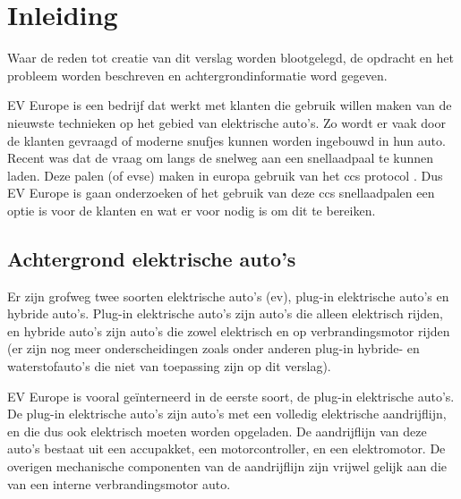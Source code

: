 \chapter{Inleiding}
\label{inleiding}

\begin{center}
    \begin{minipage}{0.5\textwidth}
        \begin{small}
            Waar de reden tot creatie van dit verslag worden blootgelegd, de
            opdracht en het probleem worden beschreven en achtergrondinformatie
            word gegeven.
        \end{small}
    \end{minipage}
    \vspace{0.5cm}
\end{center}

\noindent EV Europe is een bedrijf dat werkt met klanten die gebruik willen
maken van de nieuwste technieken op het gebied van elektrische auto's. Zo wordt
er vaak door de klanten gevraagd of moderne snufjes kunnen worden ingebouwd in
hun auto. Recent was dat de vraag om langs de snelweg aan een snellaadpaal te
kunnen laden. Deze palen (of \ac{evse}) maken in europa gebruik van het \ac{ccs}
protocol \cite{Directive_2014/94/EU}. Dus EV Europe is gaan onderzoeken of het
gebruik van deze \ac{ccs} snellaadpalen een optie is voor de klanten en wat er
voor nodig is om dit te bereiken.

\section{Achtergrond elektrische auto's}

Er zijn grofweg twee soorten elektrische auto's (\ac{ev}), plug-in elektrische
auto's en hybride auto's. Plug-in elektrische auto's zijn auto's die alleen
elektrisch rijden, en hybride auto's zijn auto's die zowel elektrisch en op
verbrandingsmotor rijden (er zijn nog meer onderscheidingen zoals onder anderen
plug-in hybride- en waterstofauto's die niet van toepassing zijn op dit
verslag).

EV Europe is vooral geïnterneerd in de eerste soort, de plug-in elektrische
auto's. De plug-in elektrische auto's zijn auto's met een volledig elektrische
aandrijflijn, en die dus ook elektrisch moeten worden opgeladen. De
aandrijflijn van deze auto's bestaat uit een accupakket, een motorcontroller,
en een elektromotor. De overigen mechanische componenten van de aandrijflijn
zijn vrijwel gelijk aan die van een interne verbrandingsmotor auto.


